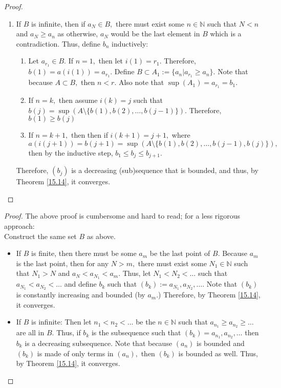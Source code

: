 \documentclass[openany, amssymb, psamsfonts]{amsart}
\newcommand{\bbN}{\mathbb{N}}
\theoremstyle{definition}
\numberwithin{equation}{section}
\begin{document}
\begin{proof}
\begin{enumerate}
\begin{enumerate}
        \item If $B$ is infinite, then if $a_N \in B,$ there must exist some $n\in \bbN$ such that $N<n$ and $a_N \geq a_n$ as otherwise, $a_N$ would be the last element in $B$ which is a contradiction. Thus, define $b_n$ inductively:
        \begin{enumerate}
            \item Let $a_{r_1}\in B.$ If $n=1,$ then let $i(1) = r_1.$ Therefore, $b(1) = a(i(1)) = a_{r_1}.$ Define $B \subset A_1:= \{a_n| a_{r_1}\geq a_n\}.$ Note that because $A \subset B,$ then $n<r.$ Also note that $\sup(A_1) = a_{r_1} = b_1.$ 
            \item If $n = k,$ then assume $i(k) = j$ such that $b(j)= \sup(A\setminus\{b(1), b(2), \dots, b(j-1)\}).$ Therefore, $b(1)\geq b(j)$\\
            \item If $n = k+1,$ then  then if $i(k+1) = j+1,$ where $a(i(j+1)) = b(j+1)=\sup(A\setminus \{b(1), b(2), \dots, b(j-1), b(j)\}),$ then by the inductive step, $b_1\leq b_j \leq b_{j+1}.$
        \end{enumerate}
        Therefore, $(b_j)$ is a decreasing (sub)sequence that is bounded, and thus, by Theorem \ref{15.14}, it converges. 
    \end{enumerate}
\end{enumerate}
\end{proof}
\begin{proof}The above proof is cumbersome and hard to read; for a less rigorous approach:\\
Construct the same set $B$ as above. 
\begin{itemize}
    \item If $B$ is finite, then there must be some $a_m$ be the last point of $B.$ Because $a_m$ is the last point, then for any $N >m,$ there must exist some $N_1\in \bbN$ such that $N_1 >N$ and $a_{N}< a_{N_1}<a_m.$ Thus, let $N_1<N_2<\dots$ such that $a_{N_1}< a_{N_2}< \dots$ and define $b_k$ such that $(b_k):= a_{N_1}, a_{N_2}, \dots.$ Note that $(b_k)$ is constantly increasing and bounded (by $a_m$.) Therefore, by Theorem \ref{15.14}, it converges. 
    \item If $B$ is infinite: Then let $n_1< n_2< \dots$ be the $n\in \bbN$ such that $a_{n_1}\geq a_{n_2}\geq \dots $ are all in $B.$ Thus, if $b_k$ is the subsequence such that $(b_k) = a_{n_1}, a_{n_2}, \dots$ then $b_k$ is a decreasing subsequence. Note that because $(a_n)$ is bounded and $(b_k)$ is made of only terms in $(a_n),$ then $(b_k)$ is bounded as well. Thus, by Theorem \ref{15.14}, it converges.
\end{itemize}
    
\end{proof}
\end{document}

